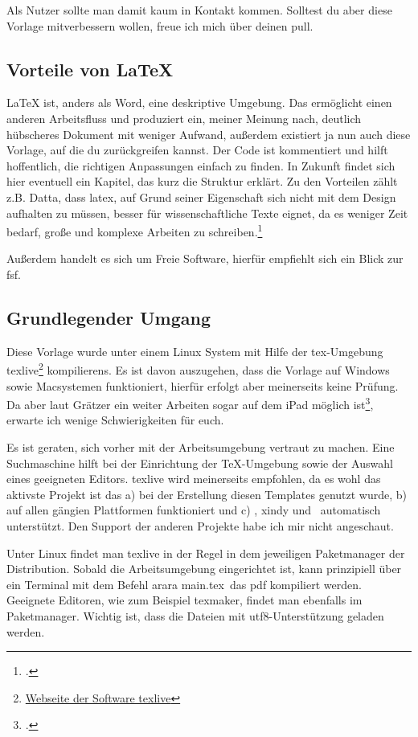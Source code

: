 Als Nutzer sollte man damit kaum in Kontakt kommen. Solltest du aber diese Vorlage mitverbessern wollen, freue ich mich über deinen \gls{pull}.
\subsection{Vorteile von \protect\LaTeX{}}%
\label{sec:vort-von}
\LaTeX{} ist, anders als Word, eine deskriptive Umgebung. Das ermöglicht einen anderen Arbeitsfluss und produziert ein, meiner Meinung nach, deutlich hübscheres Dokument mit weniger Aufwand, außerdem existiert ja nun auch diese Vorlage, auf die du zurückgreifen kannst. Der Code ist kommentiert und hilft hoffentlich, die richtigen Anpassungen einfach zu finden. In Zukunft findet sich hier eventuell ein Kapitel, das kurz die Struktur erklärt.
Zu den Vorteilen zählt z.B. Datta, dass \gls{latex}, auf Grund seiner Eigenschaft sich nicht mit dem Design aufhalten zu müssen, besser für wissenschaftliche Texte eignet, da es weniger Zeit bedarf, große und komplexe Arbeiten zu schreiben.\footcite[Vgl. ][S. 1f.]{datta_latex_2017}

Außerdem handelt es sich um Freie Software, hierfür empfiehlt sich ein Blick zur \gls{fsf}.
\subsection{Grundlegender Umgang}%
\label{sec:grundl}
Diese Vorlage wurde unter einem Linux System mit Hilfe der \gls{tex}-Umgebung texlive\footnote{\href{https://tug.org/texlive/}{Webseite der Software texlive}} \glspl{kompilieren}. Es ist davon auszugehen, dass die Vorlage auf Windows sowie Macsystemen funktioniert, hierfür erfolgt aber meinerseits keine Prüfung. Da aber laut Grätzer ein weiter Arbeiten sogar auf dem iPad möglich ist\footcite[Vgl. ][S. 179ff]{gratzer_practical_2014}, erwarte ich wenige Schwierigkeiten für euch.

Es ist geraten, sich vorher mit der Arbeitsumgebung vertraut zu machen. Eine Suchmaschine hilft bei der Einrichtung der TeX-Umgebung sowie der Auswahl eines geeigneten Editors. texlive wird meinerseits empfohlen, da es wohl das aktivste Projekt ist das a) bei der Erstellung diesen Templates genutzt wurde, b) auf allen gängien Plattformen funktioniert und c) \protect{}, xindy und \protect{}\ automatisch unterstützt. Den Support der anderen Projekte habe ich mir nicht angeschaut.

Unter Linux findet man texlive in der Regel in dem jeweiligen Paketmanager der Distribution. Sobald die Arbeitsumgebung eingerichtet ist, kann prinzipiell über ein Terminal mit dem Befehl \glqq arara main.tex\grqq\ das pdf kompiliert werden.
Geeignete Editoren, wie zum Beispiel texmaker, findet man ebenfalls im Paketmanager. Wichtig ist, dass die Dateien mit \gls{utf8}-Unterstützung geladen werden.

